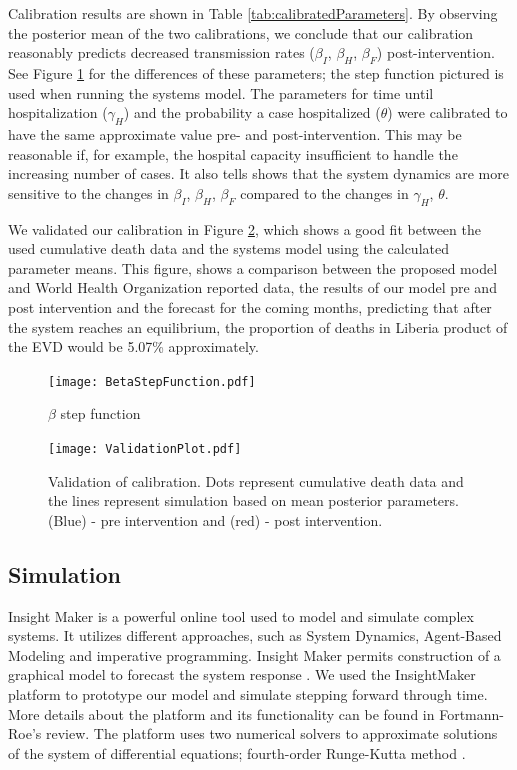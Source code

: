 Calibration results are shown in Table \ref{tab:calibratedParameters}. By observing the posterior mean of the two calibrations, we conclude that our calibration reasonably predicts decreased transmission rates ($\beta_I$, $\beta_H$, $\beta_F$) post-intervention. See Figure \ref{fig:BetaStepFunction} for the differences of these parameters; the step function pictured is used when running the systems model. The parameters for time until hospitalization ($\gamma_H$) and the probability a case hospitalized ($\theta$) were calibrated to have the same approximate value pre- and post-intervention. This may be reasonable if, for example, the hospital capacity  insufficient to handle the increasing number of cases. It also tells shows that the system dynamics are more sensitive to the changes in {$\beta_I$, $\beta_H$, $\beta_F$} compared to the changes in {$\gamma_H$, $\theta$}.


We validated our calibration in Figure \ref{fig:Cumulative _Death}, which shows a good fit between the used cumulative death data and the systems model using the calculated parameter means. This figure, shows a comparison between the proposed model and World Health Organization reported data, the results of our model pre and post intervention and the forecast for the coming months, predicting that after the system reaches an equilibrium, the proportion of deaths in Liberia product of the EVD would be 5.07\% approximately.




\begin{figure}[!h]
  \centering
  \texttt{[image: BetaStepFunction.pdf]}
  \caption{$\beta$ step function} 
\label{fig:BetaStepFunction} 
\end{figure}


\begin{figure}[h]
  \centering
  \texttt{[image: ValidationPlot.pdf]}
  \caption{Validation of calibration. Dots represent cumulative death data and the lines represent simulation based on mean posterior parameters. (Blue) - pre intervention and (red) - post intervention.}
\label{fig:Cumulative _Death}
\end{figure}




\subsection{Simulation}
 Insight Maker is a powerful online tool used to model and simulate complex systems. It utilizes different approaches, such as System Dynamics, Agent-Based Modeling and imperative programming. Insight Maker permits  construction of a graphical model to forecast the system response \cite{FortmannRoe}. We used the InsightMaker platform to prototype our model and simulate stepping forward through time. More details about the platform and its functionality can be found in Fortmann-Roe's review. The platform uses two numerical solvers to approximate solutions of the system of differential equations; fourth-order Runge-Kutta method \cite{FortmannRoe}.\\

